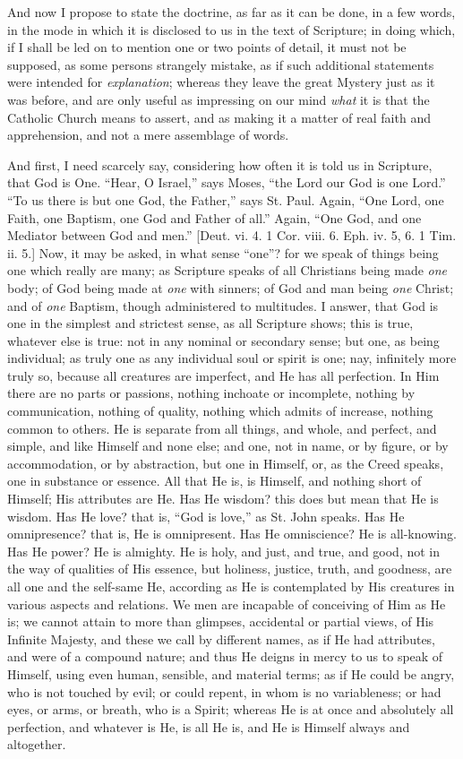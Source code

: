 And now I propose to state the doctrine, as far as it can be done,
in a few words, in the mode in which it is disclosed to us in the text
of Scripture; in doing which, if I shall be led on to mention one or
two points of detail, it must not be supposed, as some persons
strangely mistake, as if such additional statements were intended for \emph{explanation};
whereas they leave the great Mystery just as it was before, and are
only useful as impressing on our mind \emph{what} it is that the
Catholic Church means to assert, and as making it a matter of real
faith and apprehension, and not a mere assemblage of words.

And first, I need scarcely say, considering how often it is told us
in Scripture, that God is One. ``Hear, O Israel,'' says Moses,
``the Lord our God is one Lord.'' ``To us there is but one
God, the Father,'' says St. Paul. Again, ``One Lord, one
Faith, one Baptism, one God and Father of all.'' Again, ``One
God, and one Mediator between God and men.'' [Deut. vi. 4. 1 Cor.
viii. 6. Eph. iv. 5, 6. 1 Tim. ii. 5.] Now, it may be asked, in what
sense ``one''? for we speak of things being one which really
are many; as Scripture speaks of all Christians being made \emph{one}
body; of God being made at \emph{one} with sinners; of God and man
being \emph{one} Christ; and of \emph{one} Baptism, though
administered to multitudes. I answer, that God is one in the simplest
and strictest sense, as all Scripture shows; this is true, whatever
else is true: not in any nominal or secondary sense; but one, as being
individual; as truly one as any individual soul or spirit is one; nay,
infinitely more truly so, because all creatures are imperfect, and He
has all perfection. In Him there are no parts or passions, nothing
inchoate or incomplete, nothing by communication, nothing of quality,
nothing which admits of increase, nothing common to others. He is
separate from all things, and whole, and perfect, and simple, and like
Himself and none else; and one, not in name, or by figure, or by
accommodation, or by abstraction, but one in Himself, or, as the Creed
speaks, one in substance or essence. All that He is, is Himself, and
nothing short of Himself; His attributes are He. Has He wisdom? this
does but mean that He is wisdom. Has He love? that is, ``God is
love,'' as St. John speaks. Has He omnipresence? that is, He is
omnipresent. Has He omniscience? He is all-knowing. Has He power? He
is almighty. He is holy, and just, and true, and good, not in the way
of qualities of His essence, but holiness, justice, truth, and
goodness, are all one and the self-same He, according as He is
contemplated by His creatures in various aspects and relations. We men
are incapable of conceiving of Him as He is; we cannot attain to more
than glimpses, accidental or partial views, of His Infinite Majesty,
and these we call by different names, as if He had attributes, and
were of a compound nature; and thus He deigns in mercy to us to speak
of Himself, using even human, sensible, and material terms; as if He
could be angry, who is not touched by evil; or could repent, in whom
is no variableness; or had eyes, or arms, or breath, who is a Spirit;
whereas He is at once and absolutely all perfection, and whatever is
He, is all He is, and He is Himself always and altogether.

